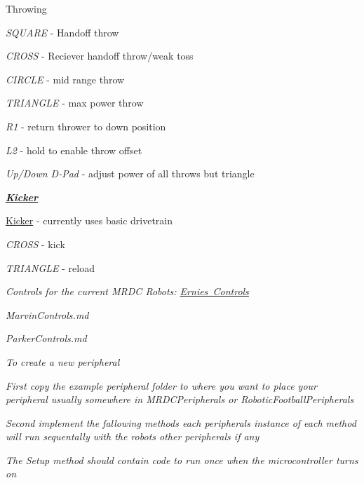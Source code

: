 \begin{DoxyItemize}
{\begin{DoxyItemize}
\item Throwing
\begin{DoxyItemize}
\item {\itshape S\+Q\+U\+A\+RE} -\/ Handoff throw
\item {\itshape C\+R\+O\+SS} -\/ Reciever handoff throw/weak toss
\item {\itshape C\+I\+R\+C\+LE} -\/ mid range throw
\item {\itshape T\+R\+I\+A\+N\+G\+LE} -\/ max power throw
\item {\itshape R1} -\/ return thrower to down position
\item {\itshape L2} -\/ hold to enable throw offset
\begin{DoxyItemize}
\item {\itshape Up/\+Down D-\/\+Pad} -\/ adjust power of all throws but triangle
\end{DoxyItemize}
\end{DoxyItemize}
\end{DoxyItemize}}
\item {\itshape {\bfseries \mbox{\hyperlink{class_kicker}{Kicker}}}
\begin{DoxyItemize}
\item \mbox{\hyperlink{class_kicker}{Kicker}} -\/ currently uses basic drivetrain
\item {\itshape C\+R\+O\+SS} -\/ kick
\item {\itshape T\+R\+I\+A\+N\+G\+LE} -\/ reload
\end{DoxyItemize}}

{\itshape  Controls for the current M\+R\+DC Robots\+: \mbox{\hyperlink{md__ernie_controls}{Ernie\textquotesingle{}s Controls}}}

{\itshape  Marvin\+Controls.\+md}

{\itshape  Parker\+Controls.\+md ~\newline
 

}
\end{DoxyItemize}

{\itshape To create a new peripheral}

{\itshape First copy the example peripheral folder to where you want to place your peripheral usually somewhere in M\+R\+D\+C\+Peripherals or Robotic\+Football\+Peripherals}

{\itshape Second implement the fallowing methods each peripheral\textquotesingle{}s instance of each method will run sequentally with the robot\textquotesingle{}s other peripherals if any}

{\itshape The Setup method should contain code to run once when the microcontroller turns on}

